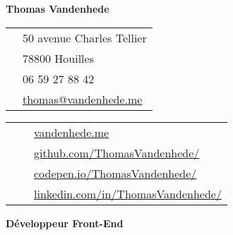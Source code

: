 \documentclass[10pt, a4paper]{article}
\def\GithubIcon{{\FA \faGithubAlt}}
\def\CodepenIcon{{\FA \faCodepen}}
\def\EnvelopeIcon{{\FA \faEnvelopeO}}
\def\MapMarkerIcon{{\FA \faMapMarker}}
\def\PhoneIcon{{\FA \faPhone}}
\def\LinkedinIcon{{\FA \faLinkedin}}
\def\CodeIcon{{\FA \faCode}}
\begin{document}
{\Large \textbf{Thomas Vandenhede}}\smallskip\\
\begin{minipage}{.5\textwidth}
	\begin{tabularx}{\linewidth}{@{}c l@{}}
		\MapMarkerIcon	& 50 avenue Charles Tellier\\
						& 78800 Houilles\\
		\PhoneIcon		& 06 59 27 88 42\\
		\EnvelopeIcon	& \href{mailto: thomas@vandenhede.me}{thomas@vandenhede.me}\\
	\end{tabularx}
\end{minipage}%
\begin{minipage}{.5\textwidth}
	\begin{tabularx}{\linewidth}{@{}X c l@{}}
		& \CodeIcon		& \href{http://vandenhede.me}{vandenhede.me}\\
		& \GithubIcon	& \href{https://github.com/ThomasVandenhede/}{github.com/ThomasVandenhede/}\\
		& \CodepenIcon	& \href{https://codepen.io/ThomasVandenhede/}{codepen.io/ThomasVandenhede/}\\
		& \LinkedinIcon	& \href{https://www.linkedin.com/in/ThomasVandenhede/}{linkedin.com/in/ThomasVandenhede/}\\
	\end{tabularx}
\end{minipage}%
\bigskip
\begin{center}
	\huge \textbf{Développeur Front-End}
\end{center}%
\end{document}
